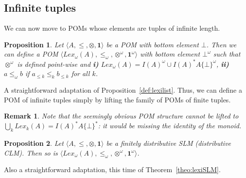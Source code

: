 \documentclass[a4paper]{elsarticle}
\newtheorem{remark}{Remark}
\newtheorem{proposition}{Proposition}
\newcommand{\monop}{\otimes}
\newcommand{\1}{\mathbf{1}}
\begin{document}

\subsection{Infinite tuples}\label{sec:infinite}
We can now move to POMs whose elements are tuples of infinite length.

\begin{proposition}
	Let $\langle A, \leq, \monop, \1 \rangle$ be a POM with bottom element $\bot$.
	Then we can define a POM 
	$\langle Lex_\omega(A), \leq_\omega, \monop^\omega, \1^\omega \rangle$ 
	with bottom element $\bot^\omega$ such that $\monop^\omega$ is defined point-wise
	and {\bf i)} $Lex_\omega(A) = I(A)^\omega \cup I(A)^\ast A \{\bot\}^\omega$, {\bf ii)} $a \leq_\omega b$ if $a_{\leq k} \leq_k b_{\leq k}$ for all $k$.
\end{proposition}

A straightforward adaptation of Proposition~\ref{def:lexilist}.
%
Thus, we can define a POM of infinite tuples simply by lifting the 
family of POMs of finite tuples.

\begin{remark}
	Note that the seemingly obvious POM structure cannot be 
	lifted to $\bigcup_k Lex_k(A) =  I(A)^\ast A \{\bot\}^\ast$: 
	it would be missing the identity of the monoid.
\end{remark}

\begin{proposition}\label{prop:lexiSLM}
	Let $\langle A, \leq, \monop, \1 \rangle$ be a finitely distributive SLM (distributive CLM).
	Then so is $\langle Lex_\omega(A), \leq_\omega, \monop^\omega, \1^\omega \rangle$.
\end{proposition}

Also a straightforward adaptation, this time of Theorem~\ref{theo:lexiSLM}.
\end{document}
